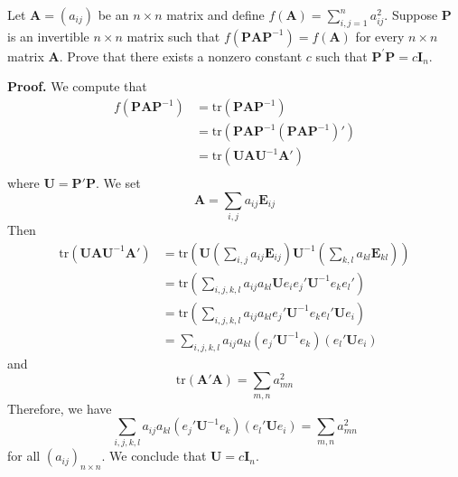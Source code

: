 \documentclass[12pt, a4paper, oneside]{book}
\begin{document}
\begin{question}
    Let $\mathbf{A}=\left(a_{i j}\right)$ be an $n \times n$ matrix and define $f(\mathbf{A})=\sum_{i, j=1}^n a_{i j}^2$. Suppose $\mathbf{P}$ is an invertible $n \times n$ matrix such that $f\left(\mathbf{P} \mathbf{A} \mathbf{P}^{-1}\right)=f(\mathbf{A})$ for every $n \times n$ matrix $\mathbf{A}$. Prove that there exists a nonzero constant $c$ such that $\mathbf{P}^{\prime} \mathbf{P}=c \mathbf{I}_n$.

    \textbf{Proof.}
    We compute that
    \[
        \begin{aligned}
            f(\mathbf{P}\mathbf{A}\mathbf{P}^{-1}) & =
            \mathrm{tr}(\mathbf{P}\mathbf{A}\mathbf{P}^{-1})                                                                                                        \\
                                                   & = \mathrm{tr}\left(\mathbf{P}\mathbf{A}\mathbf{P}^{-1}\left(\mathbf{P}\mathbf{A}\mathbf{P}^{-1}\right)'\right) \\
                                                   & = \mathrm{tr}\left(\mathbf{U} \mathbf{A} \mathbf{U}^{-1}\mathbf{A}'\right)                                     \\
        \end{aligned}
    \]
    where $\mathbf{U}=\mathbf{P}'\mathbf{P}$. We set
    \[
        \mathbf{A}=\sum_{i,j}a_{ij} \mathbf{E}_{ij}
    \]
    Then
    \[
        \begin{aligned}
            \mathrm{tr}\left(\mathbf{U} \mathbf{A} \mathbf{U}^{-1}\mathbf{A}'\right) & =\mathrm{tr}\left(\mathbf{U} \left(\sum_{i,j}a_{ij} \mathbf{E}_{ij}\right) \mathbf{U}^{-1} \left(\sum_{k,l}a_{kl} \mathbf{E}_{kl}\right)\right) \\
                                                                                     & =\mathrm{tr}\left(\sum_{i,j,k,l} a_{ij}a_{kl} \mathbf{U} e_ie_j' \mathbf{U}^{-1} e_ke_l'\right)                                                 \\
                                                                                     & =\mathrm{tr}\left(\sum_{i,j,k,l} a_{ij}a_{kl} e_j' \mathbf{U}^{-1} e_ke_l'\mathbf{U} e_i\right)                                                 \\
                                                                                     & =\sum_{i,j,k,l} a_{ij}a_{kl}\left( e_j' \mathbf{U}^{-1} e_k\right) \left(e_l'\mathbf{U} e_i\right)
        \end{aligned}
    \]
    and
    \[
        \mathrm{tr}(\mathbf{A}'\mathbf{A})=\sum_{m,n} a_{mn}^2
    \]
    Therefore, we have
    \[
        \sum_{i,j,k,l} a_{ij}a_{kl}\left( e_j' \mathbf{U}^{-1} e_k\right) \left(e_l'\mathbf{U} e_i\right)
        =
        \sum_{m,n} a_{mn}^2
    \]
    for all $\left(a_{ij}\right)_{n\times n}$. We conclude that $\mathbf{U}=c\mathbf{I}_n$.
\end{question}
\end{document}
